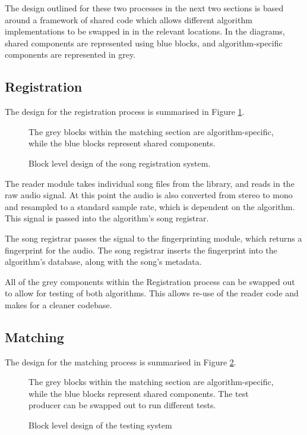 \documentclass[12pt,a4paper,twoside,openright]{report}
\begin{document}
The design outlined for these two processes in the next two sections is based around a framework of shared code which allows different algorithm implementations to be swapped in in the relevant locations. In the diagrams, shared components are represented using blue blocks, and algorithm-specific components are represented in grey. 


\subsection{Registration}

The design for the registration process is summarised in Figure \ref{figs:registration_design}. 

\begin{figure}[h]
  \centering
  
  \caption{Block level design of the song registration system.}
  \label{figs:registration_design}
  \medskip \small
  The grey blocks within the matching section are algorithm-specific, while the blue blocks represent shared components.
\end{figure}

The reader module takes individual song files from the library, and reads in the raw audio signal. At this point the audio is also converted from stereo to mono and resampled to a standard sample rate, which is dependent on the algorithm. This signal is passed into the algorithm's song registrar.

The song registrar passes the signal to the fingerprinting module, which returns a fingerprint for the audio. The song registrar inserts the fingerprint into the algorithm's database, along with the song's metadata.

All of the grey components within the Registration process can be swapped out to allow for testing of both algorithms. This allows re-use of the reader code and makes for a cleaner codebase.



\subsection{Matching}


The design for the matching process is summarised in Figure \ref{figs:matching_design}. 

\begin{figure}[h]
  \centering
  
  \caption{Block level design of the testing system}
  \label{figs:matching_design}
  \medskip \small
  The grey blocks within the matching section are algorithm-specific, while the blue blocks represent shared components. The test producer can be swapped out to run different tests.
\end{figure}
\end{document}
